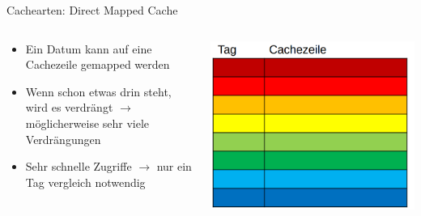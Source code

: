 \documentclass[
  german,            %
  aspectratio=169,    %
]{tumbeamer}
\begin{document}
\begin{frame}[c]{Cachearten: Direct Mapped Cache}{}
  \begin{columns}[c]
    \begin{column}{0.5\textwidth}
      \begin{itemize}
        \item Ein Datum kann auf eine Cachezeile gemapped werden 
        \item Wenn schon etwas drin steht, wird es verdrängt $\rightarrow$ möglicherweise sehr viele Verdrängungen
        \item Sehr schnelle Zugriffe $\rightarrow$ nur ein Tag vergleich notwendig
      \end{itemize}
    \end{column}
    \begin{column}{0.5\textwidth}
      \includegraphics[width=\linewidth]{w05_directmapped_rep.png}
    \end{column}
  \end{columns}
\end{frame}
\end{document}
